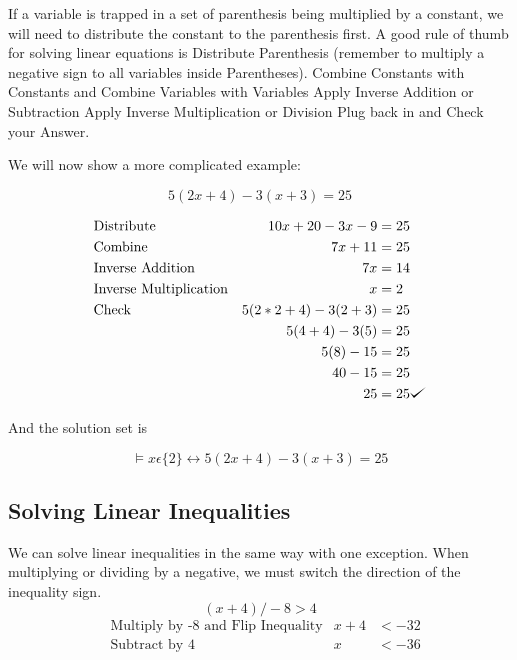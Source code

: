 \documentclass{book}
\theoremstyle{definition}
\def\checkmark{\tikz\fill[scale=0.4](0,.35) -- (.25,0) -- (1,.7) -- (.25,.15) -- cycle;}
\begin{document}
If a variable is trapped in a set of parenthesis being multiplied by a constant, we will need to distribute the constant to the parenthesis first. A good rule of thumb for solving linear equations is
Distribute Parenthesis (remember to multiply a negative sign to all variables inside Parentheses).
Combine Constants with Constants and Combine Variables with Variables
Apply Inverse Addition or Subtraction
Apply Inverse Multiplication or Division
Plug back in and Check your Answer.

We will now show a more complicated example:

\begin{equation}
\label{(4.6)}
5(2x+4)-3(x+3)=25
\end{equation}

\begin{align*}\label{(4.7)}
&\text{Distribute}             & 10x+20-3x-9      &= 25 \\
&\text{Combine}                & 7x+11            &= 25 \\
&\text{Inverse Addition}       & 7x               &= 14 \\
&\text{Inverse Multiplication} & x                &=  2 \\
&\text{Check}                  & 5(2*2+4)-3(2+3)  &= 25 \\
&                              & 5(4+4)-3(5)      &= 25 \\
&                              & 5(8)-15          &= 25 \\
&                              & 40-15            &= 25 \\
&                              & 25               &= 25 \checkmark{}
\end{align*}
            
And the solution set is

\begin{equation}
\label{(4.8)}
\models x\epsilon\{2\}\leftrightarrow 5(2x+4)-3(x+3)=25
\end{equation}

\subsection{Solving Linear Inequalities}
We can solve linear inequalities in the same way with one exception. When multiplying or dividing by a negative, we must switch the direction of the inequality sign.
\begin{equation}
\label{(4.9)}
(x+4)/-8 > 4
\end{equation}
\begin{align*}\label{(4.10)}
&\text{Multiply by -8 and Flip Inequality}        & x+4 &< -32 \\
&\text{Subtract by 4}                             & x   &< -36 
\end{align*}
\end{document}
